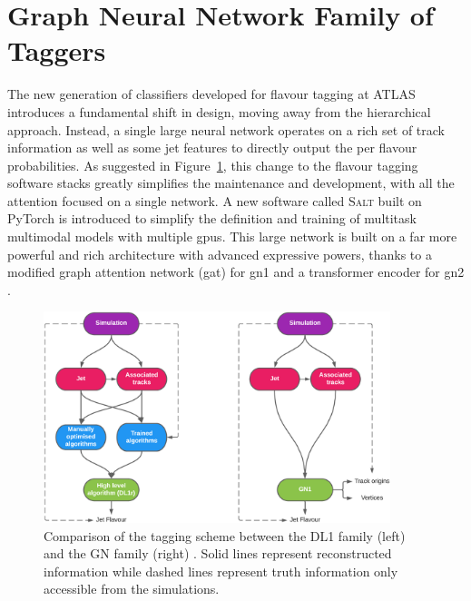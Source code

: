 \section{Graph Neural Network Family of Taggers}\label{chap:GN}
The new generation of classifiers developed for flavour tagging at ATLAS introduces a fundamental shift in design, moving away from the hierarchical approach. Instead, a single large neural network operates on a rich set of track information as well as some jet features to directly output the per flavour probabilities. As suggested in Figure~\ref{fig:ftagArchi}, this change to the flavour tagging software stacks greatly simplifies the maintenance and development, with all the attention focused on a single network. A new software called \textsc{Salt} \cite{SaltCite} built on PyTorch \cite{pytorch} is introduced to simplify the definition and training of multitask multimodal models with multiple \glspl{gpu}. This large network is built on a far more powerful and rich architecture with advanced expressive powers, thanks to a modified graph attention network (\gls{gat}) \cite{velickovic2018graph, brody2022how} for \gls{gn1} and a transformer encoder for \gls{gn2} \cite{NIPS_transformerPaper}. 

\begin{figure}[h!]
  \center
  \includegraphics[width=0.9\textwidth]{Images/FTAG/GN/Intro/schematics_difference.png}
  \caption{Comparison of the tagging scheme between the DL1 family (left) and the GN family (right) \cite{ATL-PHYS-PUB-2022-027}. Solid lines represent reconstructed information while dashed lines represent truth information only accessible from the simulations.} 
  \label{fig:ftagArchi}
\end{figure}


